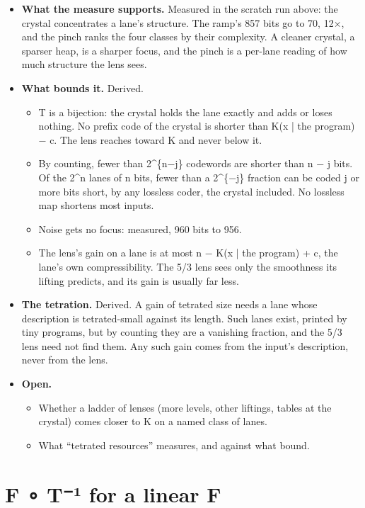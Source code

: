 \begin{itemize}
\item \textbf{What the measure supports.} Measured in the scratch run above: the crystal concentrates a lane's structure. The ramp's 857 bits go to 70, 12×, and the pinch ranks the four classes by their complexity. A cleaner crystal, a sparser heap, is a sharper focus, and the pinch is a per-lane reading of how much structure the lens sees.
\item \textbf{What bounds it.} Derived.

\begin{itemize}
\item T is a bijection: the crystal holds the lane exactly and adds or loses nothing. No prefix code of the crystal is shorter than K(x | the program) − c. The lens reaches toward K and never below it.
\item By counting, fewer than 2\textasciicircum{}\{n−j\} codewords are shorter than n − j bits. Of the 2\textasciicircum{}n lanes of n bits, fewer than a 2\textasciicircum{}\{−j\} fraction can be coded j or more bits short, by any lossless coder, the crystal included. No lossless map shortens most inputs.
\item Noise gets no focus: measured, 960 bits to 956.
\item The lens's gain on a lane is at most n − K(x | the program) + c, the lane's own compressibility. The 5/3 lens sees only the smoothness its lifting predicts, and its gain is usually far less.
\end{itemize}
\item \textbf{The tetration.} Derived. A gain of tetrated size needs a lane whose description is tetrated-small against its length. Such lanes exist, printed by tiny programs, but by counting they are a vanishing fraction, and the 5/3 lens need not find them. Any such gain comes from the input's description, never from the lens.
\item \textbf{Open.}

\begin{itemize}
\item Whether a ladder of lenses (more levels, other liftings, tables at the crystal) comes closer to K on a named class of lanes.
\item What “tetrated resources” measures, and against what bound.
\end{itemize}
\end{itemize}

\section{\texorpdfstring{F ∘ T⁻¹ for a linear F}{F ∘ T⁻¹ for a linear F}}

